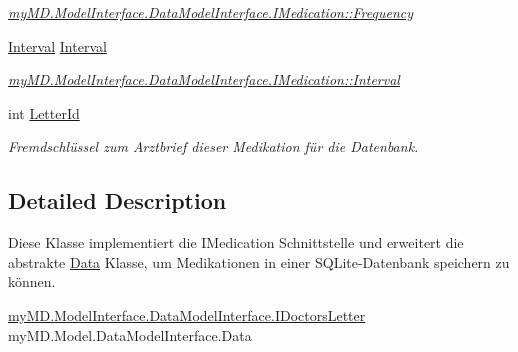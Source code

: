 \begin{CompactItemize}
\begin{CompactList}\small\item\em \hyperlink{interfacemy_m_d_1_1_model_interface_1_1_data_model_interface_1_1_i_medication_7cf395303ce3665a9834721d4b748e4b}{my\-MD.Model\-Interface.Data\-Model\-Interface.IMedication::Frequency} \item\end{CompactList}\item 
\hypertarget{classmy_m_d_1_1_model_1_1_data_model_1_1_medication_d16dd01adf735ed9b87eebff5fc39ce5}{
\hyperlink{namespacemy_m_d_1_1_model_interface_1_1_data_model_interface_d16dd01adf735ed9b87eebff5fc39ce5}{Interval} \hyperlink{classmy_m_d_1_1_model_1_1_data_model_1_1_medication_d16dd01adf735ed9b87eebff5fc39ce5}{Interval}}
\label{d0/daf/classmy_m_d_1_1_model_1_1_data_model_1_1_medication_d16dd01adf735ed9b87eebff5fc39ce5}

\begin{CompactList}\small\item\em \hyperlink{interfacemy_m_d_1_1_model_interface_1_1_data_model_interface_1_1_i_medication_d16dd01adf735ed9b87eebff5fc39ce5}{my\-MD.Model\-Interface.Data\-Model\-Interface.IMedication::Interval} \item\end{CompactList}\item 
\hypertarget{classmy_m_d_1_1_model_1_1_data_model_1_1_medication_693479e986f669c21b8a081de8815888}{
int \hyperlink{classmy_m_d_1_1_model_1_1_data_model_1_1_medication_693479e986f669c21b8a081de8815888}{Letter\-Id}}
\label{d0/daf/classmy_m_d_1_1_model_1_1_data_model_1_1_medication_693479e986f669c21b8a081de8815888}

\begin{CompactList}\small\item\em Fremdschl\"{u}ssel zum Arztbrief dieser Medikation f\"{u}r die Datenbank. \item\end{CompactList}\end{CompactItemize}


\subsection{Detailed Description}
Diese Klasse implementiert die IMedication Schnittstelle und erweitert die abstrakte \hyperlink{classmy_m_d_1_1_model_1_1_data_model_1_1_data}{Data} Klasse, um Medikationen in einer SQLite-Datenbank speichern zu k\"{o}nnen. 

\hyperlink{interfacemy_m_d_1_1_model_interface_1_1_data_model_interface_1_1_i_doctors_letter}{my\-MD.Model\-Interface.Data\-Model\-Interface.IDoctors\-Letter} my\-MD.Model.Data\-Model\-Interface.Data 



